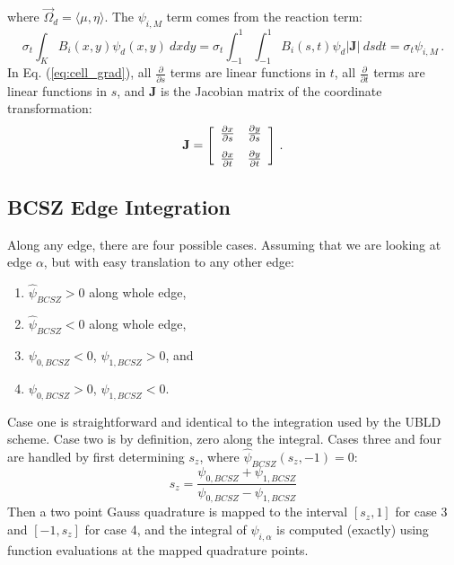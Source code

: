 \documentclass{mc2015}
\newcommand{\benum}{\begin{equation}} 			%
\newcommand{\eenum}{\end{equation}}
\newcommand{\eqt}[1]{Eq. (\ref{#1})}  %
\newcommand{\B}[1]{\ensuremath{{B_{#1} }}}
\newcommand{\p}{\ensuremath{ \partial}}
\newcommand{\abs}[1]{\ensuremath{\left\lvert #1 \right\rvert}}
\newcommand{\BCSZH}{\ensuremath{\widehat{\psi}_{BCSZ}}}
\newcommand{\omg}{\ensuremath{\vec{\Omega}}}
\newcommand{\pep}{\, .}
\begin{document}
where $\omg_d = \langle \mu ,\eta \rangle$.
The $\psi_{i,M}$ term comes from the reaction term:
\benum
\sigma_t\int_K{ \B{i}(x,y) \psi_d(x,y)~dxdy} = \sigma_t\int_{-1}^1{\int_{-1}^1{ \B{i}(s,t) \psi_d \abs{\mathbf J}~dsdt}} = \sigma_t \psi_{i,M} \pep
\eenum
In \eqt{eq:cell_grad},  all $\frac{\p}{\p s}$ terms are linear functions in $t$, all $\frac{\p}{\p t}$ terms are linear functions in $s$, and $\mathbf{J}$ is the Jacobian matrix of the coordinate transformation:
\benum
\mathbf{J} = \left[ \begin{array}{cc} 
\frac{\p x}{\p s} & \frac{\p y}{\p s} \vspace{0.1in}\\
\frac{\p x}{\p t} & \frac{\p y}{\p t}
\end{array}\right] \pep
\eenum

\subsection{BCSZ Edge Integration}
Along any edge, there are four possible cases.  Assuming that we are looking at edge $\alpha$, but with easy translation to any other edge:
\begin{enumerate}
\item $\BCSZH > 0$ along whole edge,
\item  $\BCSZH < 0$ along whole edge,
\item $\psi_{0,BCSZ} < 0$, $\psi_{1,BCSZ} > 0$, and
\item $\psi_{0,BCSZ} > 0$, $\psi_{1,BCSZ} <0$.
\end{enumerate}
Case one is straightforward and identical to the integration used by the UBLD scheme. 
Case two is by definition, zero along the integral.
Cases three and four are handled by first determining $s_z$, where $\BCSZH(s_z,-1) = 0$:
\benum
s_z = \frac{\psi_{0,BCSZ}+\psi_{1,BCSZ}}{\psi_{0,BCSZ} - \psi_{1,BCSZ} }
\eenum
Then a two point Gauss quadrature is mapped to the interval $[s_z,1]$ for case 3 and $[-1,s_z]$ for case 4, and the integral of $\psi_{i,\alpha}$
is computed (exactly) using function evaluations at the mapped quadrature points.
\end{document}
